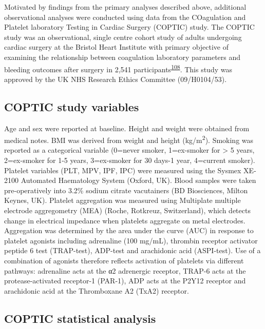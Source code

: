 \documentclass[11pt,twoside]{bristolthesis}
\begin{document}
Motivated by findings from the primary analyses described above, additional observational analyses were conducted using data from the COagulation and Platelet laboratory Testing in Cardiac Surgery (COPTIC) study. The COPTIC study was an observational, single centre cohort study of adults undergoing cardiac surgery at the Bristol Heart Institute with primary objective of examining the relationship between coagulation laboratory parameters and bleeding outcomes after surgery in 2,541 participants\textsuperscript{\protect\hyperlink{ref-Mumford2017}{108}}. This study was approved by the UK NHS Research Ethics Committee (09/H0104/53).

\hypertarget{coptic-study-variables}{%
\subsection{COPTIC study variables}\label{coptic-study-variables}}

Age and sex were reported at baseline. Height and weight were obtained from medical notes. BMI was derived from weight and height (kg/m\textsuperscript{2}). Smoking was reported as a categorical variable (0=never smoker, 1=ex-smoker for \textgreater{} 5 years, 2=ex-smoker for 1-5 years, 3=ex-smoker for 30 days-1 year, 4=current smoker). Platelet variables (PLT, MPV, IPF, IPC) were measured using the Sysmex XE-2100 Automated Haematology System (Oxford, UK). Blood samples were taken pre-operatively into 3.2\% sodium citrate vacutainers (BD Biosciences, Milton Keynes, UK). Platelet aggregation was measured using Multiplate multiple electrode aggregometry (MEA) (Roche, Rotkreuz, Switzerland), which detects change in electrical impedance when platelets aggregate on metal electrodes. Aggregation was determined by the area under the curve (AUC) in response to platelet agonists including adrenaline (100 mg/mL), thrombin receptor activator peptide 6 test (TRAP-test), ADP-test and arachidonic acid (ASPI-test). Use of a combination of agonists therefore reflects activation of platelets via different pathways: adrenaline acts at the α2 adrenergic receptor, TRAP-6 acts at the protease-activated receptor-1 (PAR-1), ADP acts at the P2Y12 receptor and arachidonic acid at the Thromboxane A2 (TxA2) receptor.

\hypertarget{coptic-statistical-analysis}{%
\subsection{COPTIC statistical analysis}\label{coptic-statistical-analysis}}
\end{document}
